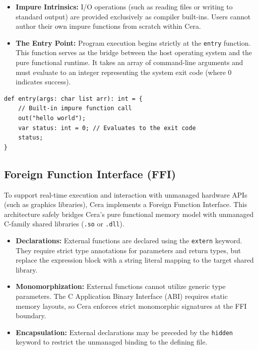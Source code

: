 \documentclass[11pt, a4paper]{article}
\begin{document}
\begin{itemize}
    \item \textbf{Impure Intrinsics:} I/O operations (such as reading files or writing to standard output) are provided exclusively as compiler built-ins. Users cannot author their own impure functions from scratch within Cera.
    \item \textbf{The Entry Point:} Program execution begins strictly at the \texttt{entry} function. This function serves as the bridge between the host operating system and the pure functional runtime. It takes an array of command-line arguments and must evaluate to an integer representing the system exit code (where 0 indicates success).
\end{itemize}

\begin{lstlisting}[language=Cera, title={Program Entry}, basicstyle=\ttfamily]
def entry(args: char list arr): int = {
    // Built-in impure function call
    out("hello world");
    var status: int = 0; // Evaluates to the exit code
    status; 
}
\end{lstlisting}

\subsection{Foreign Function Interface (FFI)}
\noindent
To support real-time execution and interaction with unmanaged hardware APIs (such as graphics libraries), Cera implements a Foreign Function Interface. This architecture safely bridges Cera's pure functional memory model with unmanaged C-family shared libraries (\texttt{.so} or \texttt{.dll}).

\begin{itemize}
    \item \textbf{Declarations:} External functions are declared using the \texttt{extern} keyword. They require strict type annotations for parameters and return types, but replace the expression block with a string literal mapping to the target shared library.
    \item \textbf{Monomorphization:} External functions cannot utilize generic type parameters. The C Application Binary Interface (ABI) requires static memory layouts, so Cera enforces strict monomorphic signatures at the FFI boundary.
    \item \textbf{Encapsulation:} External declarations may be preceded by the \texttt{hidden} keyword to restrict the unmanaged binding to the defining file.
\end{itemize}
\end{document}
